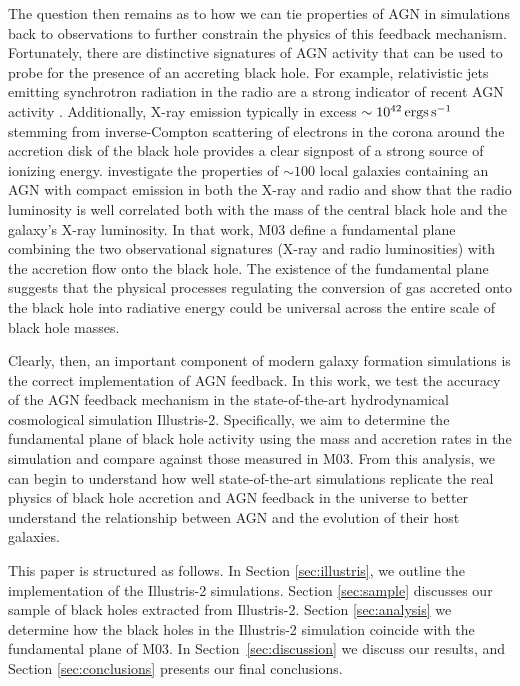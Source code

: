 The question then remains as to how we can tie properties of AGN in
simulations back to observations to further constrain the physics
of this feedback mechanism. Fortunately, there are distinctive signatures
of AGN activity that can be used to probe for the presence of an accreting
black hole. For example, relativistic jets emitting synchrotron radiation
in the radio are a strong indicator of recent AGN activity \citep{jones1974}.
Additionally, X-ray emission typically in excess $\sim10^{42}\,{\rm ergs}\,{\rm s^{-1}}$
stemming from inverse-Compton scattering of electrons in the corona
around the accretion disk of the black hole provides a clear signpost
of a strong source of ionizing energy. \citet[hereafter, M03]{merloni2003afundamental}
investigate the properties of $\sim100$ local galaxies containing
an AGN with compact emission in both the X-ray and radio and show
that the radio luminosity is well correlated both with the mass of
the central black hole and the galaxy's X-ray luminosity. In that
work, M03 define a fundamental plane combining the two observational
signatures (X-ray and radio luminosities) with the accretion flow
onto the black hole. The existence of the fundamental plane suggests
that the physical processes regulating the conversion of gas accreted
onto the black hole into radiative energy could be universal across
the entire scale of black hole masses.

Clearly, then, an important component of modern galaxy formation simulations
is the correct implementation of AGN feedback. In this work, we test
the accuracy of the AGN feedback mechanism in the state-of-the-art
hydrodynamical cosmological simulation Illustris-2. Specifically,
we aim to determine the fundamental plane of black hole activity using
the mass and accretion rates in the simulation and compare against
those measured in M03. From this analysis, we can begin to understand
how well state-of-the-art simulations replicate the real physics of
black hole accretion and AGN feedback in the universe to better understand
the relationship between AGN and the evolution of their host galaxies.

This paper is structured as follows. In Section \ref{sec:illustris},
we outline the implementation of the Illustris-2 simulations. Section
\ref{sec:sample} discusses our sample of black holes extracted from
Illustris-2. Section \ref{sec:analysis} we determine how the black
holes in the Illustris-2 simulation coincide with the fundamental
plane of M03. In Section~\ref{sec:discussion} we discuss our results,
and Section \ref{sec:conclusions} presents our final conclusions. 
